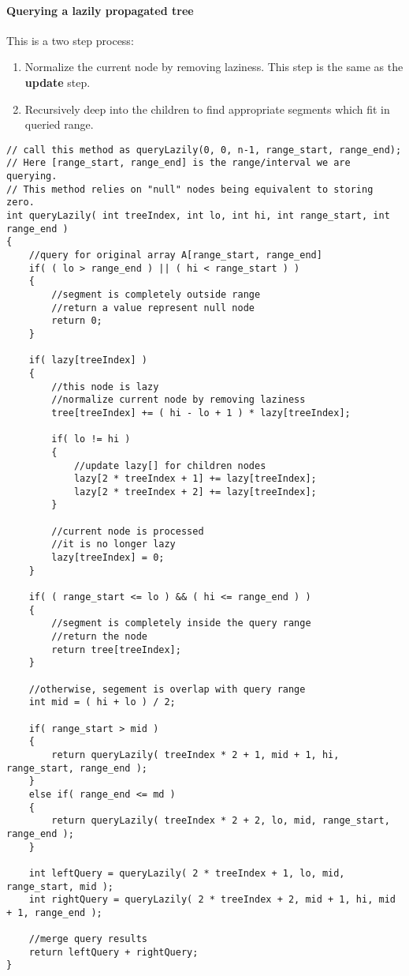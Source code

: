 \paragraph{Querying a lazily propagated tree}

This is a two step process:
\begin{enumerate}
\item Normalize the current node by removing laziness. This step is the same as the \textbf{update} step.
\item Recursively deep into the children to find appropriate segments which fit in queried range.
\end{enumerate}

\begin{lstlisting}[style=customc, caption={Query Lazily}]
// call this method as queryLazily(0, 0, n-1, range_start, range_end);
// Here [range_start, range_end] is the range/interval we are querying.
// This method relies on "null" nodes being equivalent to storing zero.
int queryLazily( int treeIndex, int lo, int hi, int range_start, int range_end )
{
    //query for original array A[range_start, range_end]
    if( ( lo > range_end ) || ( hi < range_start ) )
    {
        //segment is completely outside range
        //return a value represent null node
        return 0;
    }

    if( lazy[treeIndex] )
    {
        //this node is lazy
        //normalize current node by removing laziness
        tree[treeIndex] += ( hi - lo + 1 ) * lazy[treeIndex];

        if( lo != hi )
        {
            //update lazy[] for children nodes
            lazy[2 * treeIndex + 1] += lazy[treeIndex];
            lazy[2 * treeIndex + 2] += lazy[treeIndex];
        }

        //current node is processed
        //it is no longer lazy
        lazy[treeIndex] = 0;
    }

    if( ( range_start <= lo ) && ( hi <= range_end ) )
    {
        //segment is completely inside the query range
        //return the node
        return tree[treeIndex];
    }

    //otherwise, segement is overlap with query range
    int mid = ( hi + lo ) / 2;

    if( range_start > mid )
    {
        return queryLazily( treeIndex * 2 + 1, mid + 1, hi, range_start, range_end );
    }
    else if( range_end <= md )
    {
        return queryLazily( treeIndex * 2 + 2, lo, mid, range_start, range_end );
    }

    int leftQuery = queryLazily( 2 * treeIndex + 1, lo, mid, range_start, mid );
    int rightQuery = queryLazily( 2 * treeIndex + 2, mid + 1, hi, mid + 1, range_end );

    //merge query results
    return leftQuery + rightQuery;
}
\end{lstlisting}

